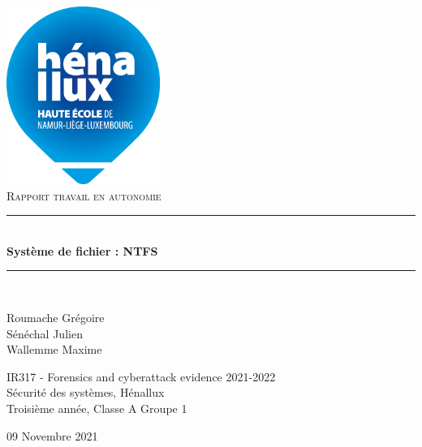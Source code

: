 \documentclass[a4paper]{article}
\newcommand{\HRule}{\rule{\linewidth}{0.5mm}}
\begin{document}
\begin{titlepage}
    \begin{sffamily}
        \begin{center}

            \includegraphics[width=5cm]{images/LogoHenallux.png}~\\[1.5cm]
            \textsc{\Large Rapport travail en autonomie}\\[1.5cm]

            \HRule \\[0.4cm]
            { \huge \bfseries Système de fichier : NTFS\\[0.4cm] }
            \HRule \\[2cm]

            \begin{minipage}{0.4\textwidth}
                \begin{flushleft} \large
                    Roumache Grégoire\\
                    Sénéchal Julien\\
                    Wallemme Maxime\\
                \end{flushleft}
            \end{minipage}
            \begin{minipage}{0.55\textwidth}
                \begin{flushright} \large
                    IR317 - Forensics and cyberattack evidence 2021-2022\\
                    Sécurité des systèmes, Hénallux\\
                    Troisième année, Classe A Groupe 1 \\
                \end{flushright}
            \end{minipage}
            \vfill

            {\large 09 Novembre 2021}

        \end{center}
    \end{sffamily}
\end{titlepage}
\end{document}
